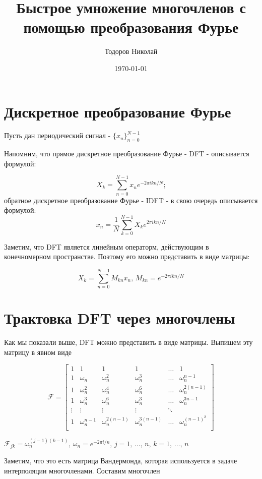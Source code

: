 \documentclass[12pt,a4paper]{article}
\title{Быстрое умножение многочленов с помощью преобразования Фурье}
\author{Тодоров Николай}
\date{\today}
\begin{document}
\maketitle

\section{Дискретное преобразование Фурье}
Пусть дан периодический сигнал - $\{x_n\}_{n=0}^{N-1}$

Напомним, что прямое дискретное преобразование Фурье - DFT - описывается формулой:

\[X_k = \sum_{n = 0}^{N-1} x_n e^{-2\pi i k n / N} \text{;}\]
обратное дискретное преобразование Фурье - IDFT - в свою очередь описывается формулой:
\[x_n = \dfrac{1}{N} \sum_{k = 0}^{N-1} X_k e^{2\pi i k n / N}\]

Заметим, что DFT является линейным операторм, действующим в конечномерном пространстве.
Поэтому его можно представить в виде матрицы:

\[X_k = \sum_{n=0}^{N-1}M_{kn}x_n \text{, } M_{kn} = e^{-2\pi i k n /N} \] 

\section{Трактовка DFT через многочлены}

Как мы показали выше, DFT можно представить в виде матрицы.
Выпишем эту матрицу в явном виде

\[\mathcal{F} = 
\begin{bmatrix}
1 & 1 & 1 & 1 & \dots & 1 \\
1 & \omega_n & \omega_n^2 & \omega_n^3 & \dots & \omega_n^{n-1} \\
1 & \omega_n^2 & \omega_n^4 & \omega_n^6 & \dots & \omega_n^{2(n-1)} \\
1 & \omega_n^3 & \omega_n^6 & \omega_n^3 & \dots & \omega_n^{3n-1} \\
\vdots & \vdots & \vdots & \vdots & \ddots \\
1 & \omega_n^{n-1} & \omega_n^{2(n-1)} & \omega_n^{3(n-1)} & \dots & \omega_n^{(n-1)^2} \\
\end{bmatrix}
\]

$\mathcal{F}_{jk} = \omega_n^{(j-1)(k-1)} \text{, } 
\omega_n = e^{-2\pi i / n}
\text{, } j = 1 \text{, } \dots \text{, } n
\text{, } k = 1 \text{, } \dots \text{, } n$ 

Заметим, что это есть матрица Вандермонда, которая используется
в задаче интерполяции многочленами. Составим многочлен
\end{document}
